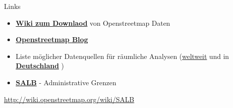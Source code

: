 \documentclass[ignorenonframetext,]{beamer}
\begin{document}
\begin{frame}{Links}
\protect\hypertarget{links}{}

\begin{itemize}
\item
  \href{http://wiki.openstreetmap.org/wiki/Downloading_data}{\textbf{Wiki
  zum Downlaod}} von Openstreetmap Daten
\item
  \href{http://blog.openstreetmap.de/}{\textbf{Openstreetmap Blog}}
\item
  Liste möglicher Datenquellen für räumliche Analysen
  (\href{http://wiki.openstreetmap.org/wiki/Potential_Datasources}{weltweit}
  und in
  \href{http://wiki.openstreetmap.org/wiki/DE:Potential_Datasources}{\textbf{Deutschland}}
  )
\item
  \href{http://wiki.openstreetmap.org/wiki/SALB}{\textbf{SALB}} -
  Administrative Grenzen
\end{itemize}

\url{http://wiki.openstreetmap.org/wiki/SALB}

\end{frame}
\end{document}
